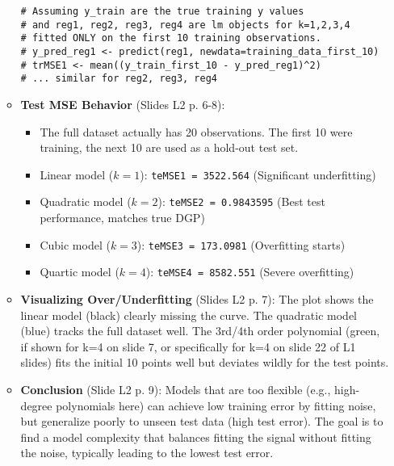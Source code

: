 \documentclass[12pt,a4paper]{article}
\newcommand{\Rcode}[1]{\texttt{#1}} %
\begin{document}
\begin{itemize}
\begin{itemize}
\begin{lstlisting}[caption={R code for Training MSE (Conceptual - from Slides L2 p.5 values)}, label={lst:trainmse_poly}]
# Assuming y_train are the true training y values
# and reg1, reg2, reg3, reg4 are lm objects for k=1,2,3,4
# fitted ONLY on the first 10 training observations.
# y_pred_reg1 <- predict(reg1, newdata=training_data_first_10)
# trMSE1 <- mean((y_train_first_10 - y_pred_reg1)^2)
# ... similar for reg2, reg3, reg4
\end{lstlisting}
            \item \textbf{Test MSE Behavior} (Slides L2 p. 6-8):
                \begin{itemize}
                    \item The full dataset actually has 20 observations. The first 10 were training, the next 10 are used as a hold-out test set.
                    \item Linear model ($k=1$): \Rcode{teMSE1 = 3522.564} (Significant underfitting)
                    \item Quadratic model ($k=2$): \Rcode{teMSE2 = 0.9843595} (Best test performance, matches true DGP)
                    \item Cubic model ($k=3$): \Rcode{teMSE3 = 173.0981} (Overfitting starts)
                    \item Quartic model ($k=4$): \Rcode{teMSE4 = 8582.551} (Severe overfitting)
                \end{itemize}
            \item \textbf{Visualizing Over/Underfitting} (Slides L2 p. 7): The plot shows the linear model (black) clearly missing the curve. The quadratic model (blue) tracks the full dataset well. The 3rd/4th order polynomial (green, if shown for k=4 on slide 7, or specifically for k=4 on slide 22 of L1 slides) fits the initial 10 points well but deviates wildly for the test points.
            \item \textbf{Conclusion} (Slide L2 p. 9): Models that are too flexible (e.g., high-degree polynomials here) can achieve low training error by fitting noise, but generalize poorly to unseen test data (high test error). The goal is to find a model complexity that balances fitting the signal without fitting the noise, typically leading to the lowest test error.
        \end{itemize}


\end{itemize}
\end{document}
